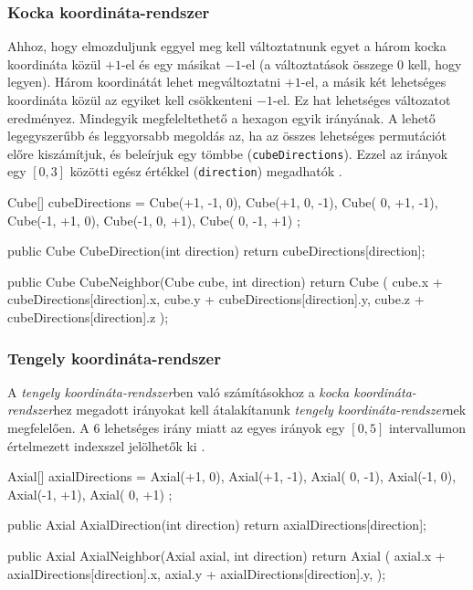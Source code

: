 \subsubsection{Kocka koordináta-rendszer}

Ahhoz, hogy elmozduljunk eggyel meg kell változtatnunk egyet a három kocka koordináta közül $+1$-el és egy másikat $-1$-el (a változtatások összege $0$ kell, hogy legyen). Három koordinátát lehet megváltoztatni $+1$-el, a másik két lehetséges koordináta közül az egyiket kell csökkenteni $-1$-el. Ez hat lehetséges változatot eredményez. Mindegyik megfeleltethető a hexagon egyik irányának. A lehető legegyszerűbb és leggyorsabb megoldás az, ha az összes lehetséges permutációt előre kiszámítjuk, és beleírjuk egy tömbbe (\texttt{cubeDirections}). Ezzel az irányok egy $[0, 3]$ közötti egész értékkel (\texttt{direction}) megadhatók \cite{redblobgamesHexagonalGrids}.
\begin{cpp}
Cube[] cubeDirections = 
{ 
   Cube(+1, -1,  0), Cube(+1,  0, -1), Cube( 0, +1, -1),
   Cube(-1, +1,  0), Cube(-1,  0, +1), Cube( 0, -1, +1) 
};

public Cube CubeDirection(int direction)
{
   return cubeDirections[direction];
}

public Cube CubeNeighbor(Cube cube, int direction)
{
   return Cube
   (
      cube.x + cubeDirections[direction].x, 
      cube.y + cubeDirections[direction].y, 
      cube.z + cubeDirections[direction].z
   );
}
\end{cpp}

\subsubsection{Tengely koordináta-rendszer}

\noindent A \textit{tengely koordináta-rendszer}ben való számításokhoz a \textit{kocka koordináta-rendszer}hez megadott irányokat kell átalakítanunk \textit{tengely koordináta-rendszer}nek megfelelően. A 6 lehetséges irány miatt az egyes irányok egy $[0, 5]$ intervallumon értelmezett indexszel jelölhetők ki \cite{redblobgamesHexagonalGrids}.
\begin{cpp}
Axial[] axialDirections = 
{ 
   Axial(+1,  0), Axial(+1, -1), Axial( 0, -1),
   Axial(-1,  0), Axial(-1, +1), Axial( 0, +1)
};

public Axial AxialDirection(int direction)
{
   return axialDirections[direction];
}

public Axial AxialNeighbor(Axial axial, int direction)
{
   return Axial
   (
      axial.x + axialDirections[direction].x, 
      axial.y + axialDirections[direction].y, 
   );
}
\end{cpp}

